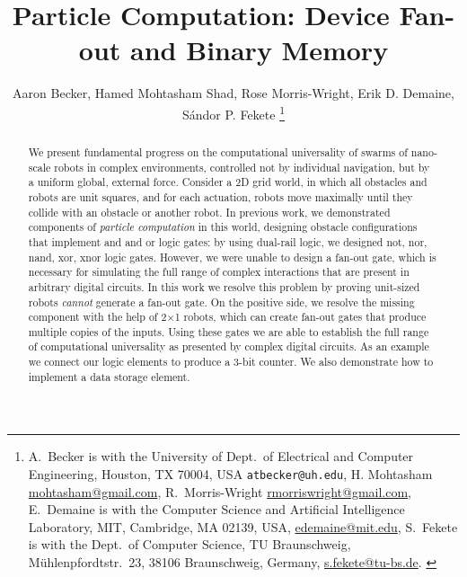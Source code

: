 \documentclass[letterpaper, 10 pt, conference]{ieeeconf}
\begin{document}


\title{\LARGE \bf 
Particle Computation:  Device Fan-out and Binary Memory 
}
\author{Aaron Becker,
Hamed Mohtasham Shad,
Rose Morris-Wright,
Erik D. Demaine,
S\'andor P. Fekete
\thanks{{A.~Becker is with the University of  Dept.~of Electrical and Computer Engineering, Houston, TX 70004, USA {\tt\small atbecker@uh.edu}, 
H. Mohtasham  \protect\url{mohtasham@gmail.com},
R.~Morris-Wright  \protect\url{rmorriswright@gmail.com},
E.~Demaine is with the Computer Science and Artificial Intelligence Laboratory, MIT, Cambridge, MA 02139, USA,      \protect\url{edemaine@mit.edu},
S.~Fekete is with the Dept.~of Computer Science, TU Braunschweig,  M\"uhlenpfordtstr.~23, 38106 Braunschweig, Germany,
      \protect\url{s.fekete@tu-bs.de}.
}
} %
} %
\maketitle



\begin{abstract} 
We present fundamental progress on the computational universality of swarms of nano-scale robots
in complex environments, controlled not by individual navigation, but by a uniform global, external force.
Consider a 2D grid world, in which all obstacles and robots are unit squares,
and for each actuation, robots move maximally until they collide with an
obstacle or another robot. In previous work, we demonstrated components of \emph{particle computation} in this
world, designing obstacle configurations that implement {\sc and} and {\sc or}
logic gates:  by using dual-rail logic, we designed {\sc not, nor, nand, xor,
xnor} logic gates. However, we were unable to design a {\sc fan-out} gate, which
is necessary for simulating the full range of complex interactions
that are present in arbitrary digital circuits. In this work we resolve this 
problem by proving unit-sized robots {\em cannot} generate a {\sc fan-out} gate.  
On the positive side, we resolve the missing component with the help of 
2$\times$1 robots, which can create fan-out gates that produce multiple copies
of the inputs.  Using these gates we are able to establish the full range
of computational universality as presented by complex digital circuits.  As
an example we connect our logic elements to produce a 3-bit counter.  We also
demonstrate how to implement a data storage element.
\end{abstract}
\end{document}
